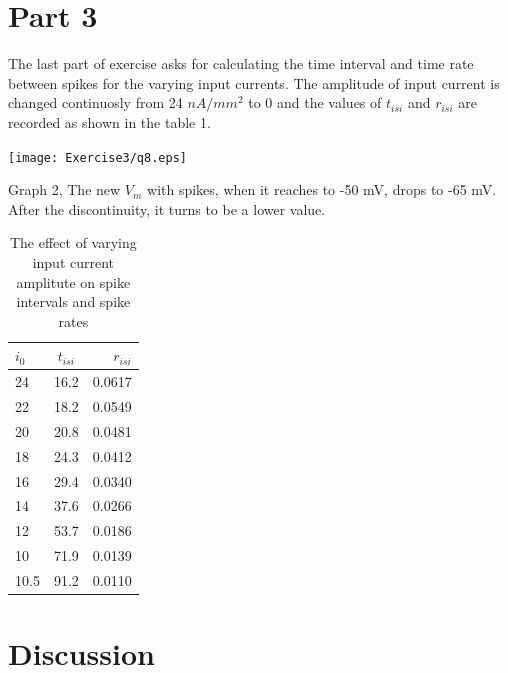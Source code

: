 \documentclass{article}
\begin{document}
\section*{Part 3}

The last part of exercise asks for calculating the time interval and time rate between spikes for the varying input currents. The amplitude of input current is changed continuosly from 24 $nA/mm^{2}$ to 0 and the values of $t_{isi}$ and $r_{isi}$ are recorded as shown in the table 1. 

\begin{center}
 
\texttt{[image: Exercise3/q8.eps]}

Graph 2, The new $V_{m}$ with spikes, when it reaches to -50 mV,  drops to -65 mV. After the discontinuity, it turns to be a lower value.
\end{center}

\begin {table} [h]
\caption { The effect of varying input current amplitute on spike intervals and spike rates} \label{tab:title}
\begin{center}
  \begin{tabular}{ l | c | r }


    \hline
$i_{0}$ & $t_{isi}$ & $r_{isi}$\\ \hline \hline
 
    24 & 16.2 & 0.0617 \\ \hline
    22 & 18.2 & 0.0549 \\ \hline
    20 & 20.8 & 0.0481 \\ \hline
    18 & 24.3 & 0.0412 \\ \hline
    16 & 29.4 & 0.0340 \\ \hline
    14 & 37.6 & 0.0266 \\ \hline
    12 & 53.7 & 0.0186 \\ \hline
    10 & 71.9 & 0.0139 \\ \hline
  10.5 & 91.2 & 0.0110 \\ \hline



  \end{tabular}
\end{center}

\end{table}

\section*{Discussion}
\end{document}

